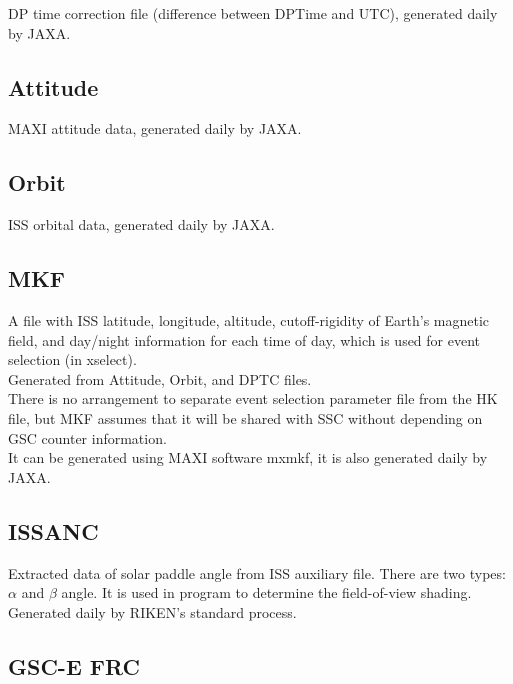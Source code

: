 \documentclass[10pt]{report}
\renewcommand{\_}{\textscale{.5}{\textbf{\textunderscore}}}
\begin{document}
DP time correction file (difference between DPTime and UTC), generated daily by JAXA. \\

\subsection{Attitude}\label{subsec:2.3.2}

MAXI attitude data, generated daily by JAXA. \\

\subsection{Orbit}\label{subsec:2.3.3}

ISS orbital data, generated daily by JAXA. \\

\subsection{MKF}\label{subsec:2.3.4}

A file with ISS latitude, longitude, altitude, cutoff-rigidity of Earth's magnetic field, and day/night information for each time of day, which is used for event selection (in xselect).\\
\indent Generated from Attitude, Orbit, and DPTC files.\\
\indent There is no arrangement to separate event selection parameter file from the HK file, but MKF assumes that it will be shared with SSC without depending on GSC counter information. \\
\indent It can be generated using MAXI software mxmkf, it is also generated daily by JAXA.\\

\subsection{ISSANC}\label{subsec:2.3.5}

Extracted data of solar paddle angle from ISS auxiliary file. There are two types: $\alpha$ and $\beta$ angle. It is used in program to determine the field-of-view shading. \\
\indent Generated daily by RIKEN's standard process. \\

\subsection{GSC-E FRC}\label{subsec:2.3.6}
\end{document}
